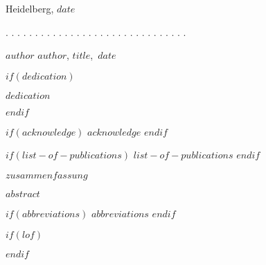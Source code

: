 \documentclass[a4paper,11pt]{article}
\newcommand{\thesisauthor}{$author$}
\newcommand{\thesisdate}{$date$}
\begin{document}
Heidelberg, \thesisdate{}
\vspace{3cm}

. . . . . . . . . . . . . . . . . . . . . . . . . . . . . . .
\vspace{0.1cm}

\thesisauthor{}
\newpage
\vspace*{\fill}
$author$, \textit{$title$}, \textcopyright\,\thesisdate{}
\newpage

$if(dedication)$
\null
\vspace{5cm}
\begin{center}
\textit{$dedication$}
\end{center}
\newpage\null\thispagestyle{empty}\newpage
$endif$


$if(acknowledge)$
\newpage
$acknowledge$
$endif$
\pagestyle{plain}
\setcounter{page}{1}    %
\newpage\null\thispagestyle{empty}\newpage


$if(list-of-publications)$
$list-of-publications$
\newpage\null\thispagestyle{empty}\newpage
$endif$


$zusammenfassung$
\newpage\null\thispagestyle{empty}\newpage


$abstract$
\newpage\null\thispagestyle{empty}\newpage

\newpage
\tableofcontents
\clearpage

$if(abbreviations)$
\newpage
$abbreviations$
$endif$

$if(lof)$
\newpage
\listoffigures
{}
$endif$
\end{document}
